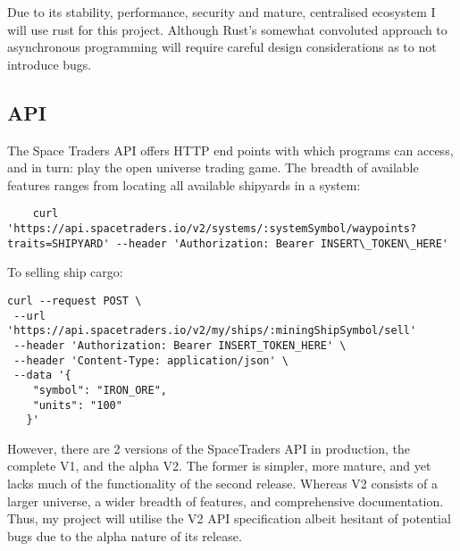 Due to its stability, performance, security and mature, centralised ecosystem I will use rust for this project. Although Rust’s somewhat convoluted approach to asynchronous programming will require careful design considerations as to not introduce bugs. 

\subsection{API}

The Space Traders API offers HTTP end points with which programs can access, and in turn: play the open universe trading game. The breadth of available features ranges from locating all available shipyards in a system:
\begin{lstlisting}
    curl 'https://api.spacetraders.io/v2/systems/:systemSymbol/waypoints?traits=SHIPYARD' --header 'Authorization: Bearer INSERT\_TOKEN\_HERE'

\end{lstlisting}
To selling ship cargo:

\begin{lstlisting}
curl --request POST \
 --url 'https://api.spacetraders.io/v2/my/ships/:miningShipSymbol/sell'
 --header 'Authorization: Bearer INSERT_TOKEN_HERE' \
 --header 'Content-Type: application/json' \
 --data '{
    "symbol": "IRON_ORE",
    "units": "100"
   }'
\end{lstlisting}

However, there are 2 versions of the SpaceTraders API in production, the complete V1, and the alpha V2. The former is simpler, more mature, and yet lacks much of the functionality of the second release.  Whereas V2 consists of a larger universe, a wider breadth of features, and comprehensive documentation. Thus, my project will utilise the V2 API specification albeit hesitant of potential bugs due to the alpha nature of its release. 
